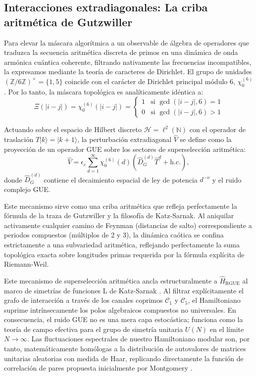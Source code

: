 \documentclass[aps,prl,preprint,superscriptaddress,floatfix]{revtex4-2}
\newcommand{\N}{\mathbb{N}}
\newcommand{\Hilb}{\mathcal{H}}
\newcommand{\Zmod}{\mathbb{Z}/6\mathbb{Z}}
\begin{document}
\subsection{Interacciones extradiagonales: La criba aritmética de Gutzwiller}

Para elevar la máscara algorítmica a un observable de álgebra de operadores que traduzca la secuencia aritmética discreta de primos en una dinámica de onda armónica cuántica coherente, filtrando nativamente las frecuencias incompatibles, la expresamos mediante la teoría de caracteres de Dirichlet. El grupo de unidades $(\Zmod)^\times = \{1, 5\}$ coincide con el carácter de Dirichlet principal módulo 6, $\chi_0^{(6)}$. Por lo tanto, la máscara topológica es analíticamente idéntica a:
\begin{equation}
\Xi(|i-j|) = \chi_0^{(6)}(|i-j|) = \begin{cases} 
1 & \text{si } \gcd(|i-j|, 6) = 1 \\ 
0 & \text{si } \gcd(|i-j|, 6) > 1 
\end{cases}
\end{equation}

Actuando sobre el espacio de Hilbert discreto $\Hilb = \ell^2(\N)$ con el operador de traslación $\hat{T}|k\rangle = |k+1\rangle$, la perturbación extradiagonal $\hat{V}$ se define como la proyección de un operador GUE sobre los sectores de superselección aritmética:
\begin{equation}
\label{eq:interaction}
\hat{V} = \epsilon_c \sum_{d=1}^{\infty} \chi_0^{(6)}(d) \left( \hat{D}_G^{(d)} \hat{T}^d + \text{h.c.} \right),
\end{equation}
donde $\hat{D}_G^{(d)}$ contiene el decaimiento espacial de ley de potencia $d^{-\nu}$ y el ruido complejo GUE. 

Este mecanismo sirve como una criba aritmética que refleja perfectamente la fórmula de la traza de Gutzwiller y la filosofía de Katz-Sarnak. Al aniquilar activamente cualquier camino de Feynman (distancias de salto) correspondiente a periodos compuestos (múltiplos de 2 y 3), la dinámica caótica se confina estrictamente a una subvariedad aritmética, reflejando perfectamente la suma topológica exacta sobre longitudes primas requerida por la fórmula explícita de Riemann-Weil.

Este mecanismo de superselección aritmética ancla estructuralmente a $\hat{H}_{\text{RGUE}}$ al marco de simetrías de funciones L de Katz-Sarnak \cite{KatzSarnak1999}. Al filtrar explícitamente el grafo de interacción a través de los canales coprimos $\mathcal{C}_1$ y $\mathcal{C}_5$, el Hamiltoniano suprime intrínsecamente los polos algebraicos compuestos no universales. En consecuencia, el ruido GUE no es una mera capa estocástica; funciona como la teoría de campo efectiva para el grupo de simetría unitaria $U(N)$ en el límite $N \to \infty$. Las fluctuaciones espectrales de nuestro Hamiltoniano modular son, por tanto, matemáticamente homólogas a la distribución de autovalores de matrices unitarias aleatorias con medida de Haar, replicando directamente la función de correlación de pares propuesta inicialmente por Montgomery \cite{Montgomery1973}.
\end{document}
